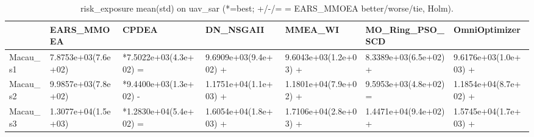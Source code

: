 \begin{table}[t]
\centering
\caption{risk_exposure mean(std) on uav_sar (*=best; +/-/= = EARS_MMOEA better/worse/tie, Holm).}
\label{tab:uav_sar_risk_exposure}
\begin{tabular}{lllllll}
\toprule
 & EARS\_MMOEA & CPDEA & DN\_NSGAII & MMEA\_WI & MO\_Ring\_PSO\_SCD & OmniOptimizer \\
\midrule
Macau\_s1 & 7.8753e+03(7.6e+02) & *7.5022e+03(4.3e+02) = & 9.6909e+03(9.4e+02) + & 9.6043e+03(1.2e+03) + & 8.3389e+03(6.5e+02) + & 9.6176e+03(1.0e+03) + \\
Macau\_s2 & 9.9857e+03(7.8e+02) & *9.4400e+03(1.3e+02) - & 1.1751e+04(1.1e+03) + & 1.1801e+04(7.9e+02) + & 9.5953e+03(4.8e+02) = & 1.1854e+04(8.7e+02) + \\
Macau\_s3 & 1.3077e+04(1.5e+03) & *1.2830e+04(5.4e+02) = & 1.6054e+04(1.8e+03) + & 1.7106e+04(2.8e+03) + & 1.4471e+04(9.4e+02) + & 1.5745e+04(1.7e+03) + \\
\bottomrule
\end{tabular}
\end{table}
